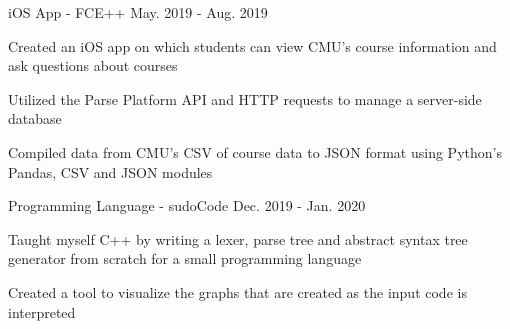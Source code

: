 

\begin{cventries}

  \cvproject
    {iOS App - FCE++} %
    {May. 2019 - Aug. 2019} %
    {
      \begin{cvitems} %
          \item Created an iOS app on which students can view CMU’s course information and ask questions about courses
          \item Utilized the Parse Platform API and HTTP requests to manage a server-side database
          \item Compiled data from CMU’s CSV of course data to JSON format using Python’s Pandas, CSV and JSON modules
      \end{cvitems}
    }

  \cvproject
    {Programming Language - sudoCode} %
    {Dec. 2019 - Jan. 2020} %
    {
      \begin{cvitems} %
          \item Taught myself C++ by writing a lexer, parse tree and abstract syntax tree generator from scratch for a small programming language
          \item Created a tool to visualize the graphs that are created as the input code is interpreted
      \end{cvitems}
    }

\end{cventries}
